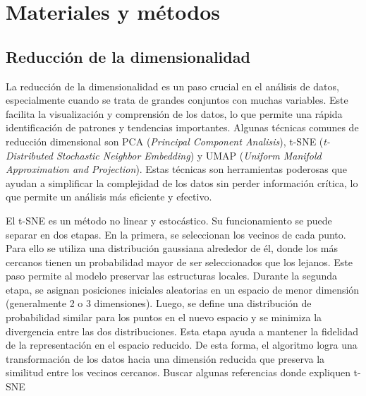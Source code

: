 \chapter{Materiales y métodos}
\label{cap1}
\section{Reducción de la dimensionalidad}
\label{c11}
\onehalfspacing


La reducción de la dimensionalidad es un paso crucial en el análisis de datos, especialmente cuando se trata de grandes conjuntos con muchas variables. Este facilita la visualización y comprensión de los datos, lo que permite una rápida identificación de patrones y tendencias importantes. Algunas técnicas comunes de reducción dimensional son PCA (\textit{Principal Component Analisis}), t-SNE (\textit{t-Distributed Stochastic Neighbor Embedding}) y UMAP (\textit{Uniform Manifold Approximation and Projection}). Estas técnicas son herramientas poderosas que ayudan a simplificar la complejidad de los datos sin perder información crítica, lo que permite un análisis más eficiente y efectivo.

El t-SNE es un método no linear y estocástico. Su funcionamiento se puede separar en dos etapas. En la primera, se seleccionan los vecinos de cada punto. Para ello se utiliza una distribución gaussiana alrededor de él, donde los más cercanos tienen un probabilidad mayor de ser seleccionados que los lejanos. Este paso permite al modelo preservar las estructuras locales. Durante la segunda etapa, se asignan posiciones iniciales aleatorias en un espacio de menor dimensión (generalmente 2 o 3 dimensiones). Luego, se define una distribución de probabilidad similar para los puntos en el nuevo espacio y se minimiza la divergencia entre las dos distribuciones. Esta etapa ayuda a mantener la fidelidad de la representación en el espacio reducido. De esta forma, el algoritmo logra una transformación de los datos hacia una dimensión reducida que preserva la similitud entre los vecinos cercanos. \alert{Buscar algunas referencias donde expliquen t-SNE} %

